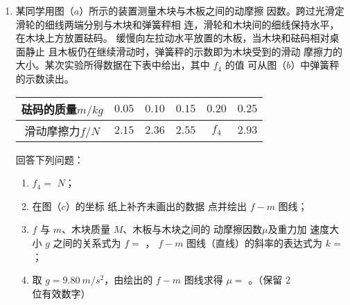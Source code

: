 \begin{enumerate}
\newpage
\item
{}
某同学用图（$ a $）所示的装置测量木块与木板之间的动摩擦
因数。跨过光滑定滑轮的细线两端分别与木块和弹簧秤相
连，滑轮和木块间的细线保持水平，在木块上方放置砝码。
缓慢向左拉动水平放置的木板，当木块和砝码相对桌面静止
且木板仍在继续滑动时，弹簧秤的示数即为木块受到的滑动
摩擦力的大小。某次实验所得数据在下表中给出，其中 $ f_{4} $ 的值
可从图（$ b $）中弹簧秤的示数读出。
\begin{figure}[h!]
\centering

\end{figure}

\begin{table}[h!]
\centering 
\begin{tabular}{|c|c|c|c|c|c|}
\hline 
砝码的质量$ m/kg $ & $ 0.05 $ & $ 0.10 $ & $ 0.15 $ & $ 0.20 $ & $ 0.25 $
 \\
\hline
滑动摩擦力$ f/N $ & $ 2.15 $ & $ 2.36 $ & $ 2.55 $ & $ f_{4} $ & $ 2.93 $\\ 
\hline 
\end{tabular}
\end{table} 
\begin{figure}[h!]
\centering

\end{figure}




回答下列问题：
\begin{enumerate}
\renewcommand{\labelenumi}{\arabic{enumi}.}
\item
$ f_4= $  $ N $；




\item 
在图（$ c $）的坐标
纸上补齐未画出的数据
点并绘出 $ f-m $ 图线；
\banswer{
  
}


\item 
$ f $ 与 $ m $、木块质量
$ M $、木板与木块之间的
动摩擦因数$ \mu $及重力加
速度大小 $ g $ 之间的关系式为 $ f= $
， $ f-m $ 图线（直线）的斜率的表达式为 $ k= $ ； 

\item 
取 $ g=9.80 \ m/s^{2} $，由绘出的 $ f-m $ 图线求得 $ \mu= $
 。（保留 $ 2 $ 位有效数字）
\end{enumerate}





\end{enumerate}
